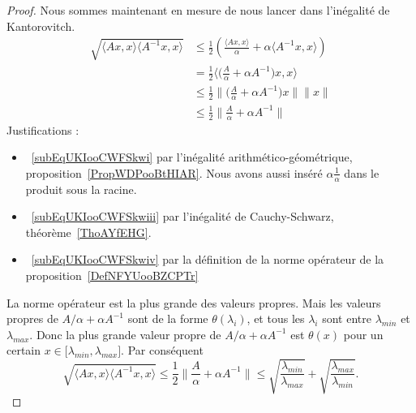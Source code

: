 \begin{proof}
	Nous sommes maintenant en mesure de nous lancer dans l'inégalité de Kantorovitch.
	\begin{subequations}
		\begin{align}
			\sqrt{\langle Ax, x\rangle \langle A^{-1}x, x\rangle } & \leq  \frac{ 1 }{2}\left( \frac{ \langle Ax, x\rangle  }{ \alpha }+\alpha\langle A^{-1}x, x\rangle  \right)   \label{subEqUKIooCWFSkwi} \\
			                                                       & =   \frac{ 1 }{2}\langle \big( \frac{ A }{ \alpha }+\alpha A^{-1} \big)x , x\rangle                                                     \\
			                                                       & \leq  \frac{ 1 }{2} \Big\| \big( \frac{ A }{ \alpha }+\alpha A^{-1} \big)x \|\| x \|                \label{subEqUKIooCWFSkwiii}         \\
			                                                       & \leq  \frac{ 1 }{2}\| \frac{ A }{ \alpha }+\alpha A^{-1} \| \label{subEqUKIooCWFSkwiv}
		\end{align}
	\end{subequations}
	Justifications :
	\begin{itemize}
		\item~\ref{subEqUKIooCWFSkwi} par l'inégalité arithmético-géométrique, proposition~\ref{PropWDPooBtHIAR}. Nous avons aussi inséré \( \alpha\frac{1}{ \alpha }\) dans le produit sous la racine.
		\item~\ref{subEqUKIooCWFSkwiii} par l'inégalité de Cauchy-Schwarz, théorème~\ref{ThoAYfEHG}.
		\item~\ref{subEqUKIooCWFSkwiv} par la définition de la norme opérateur de la proposition~\ref{DefNFYUooBZCPTr}
	\end{itemize}
	La norme opérateur est la plus grande des valeurs propres. Mais les valeurs propres de \( A/\alpha+\alpha A^{-1}\) sont de la forme \( \theta(\lambda_i)\), et tous les \( \lambda_i\) sont entre \( \lambda_{min} \) et \( \lambda_{max}\). Donc la plus grande valeur propre de \( A/\alpha+\alpha A^{-1}\) est \( \theta(x)\) pour un certain \( x\in\mathopen[ \lambda_{min} , \lambda_{max} \mathclose]\). Par conséquent
	\begin{equation}
		\sqrt{\langle Ax, x\rangle \langle A^{-1}x, x\rangle }\leq \frac{ 1 }{2}\| \frac{ A }{ \alpha }+\alpha A^{-1} \| \leq \sqrt{\frac{ \lambda_{min} }{ \lambda_{max} }}+\sqrt{\frac{ \lambda_{max} }{ \lambda_{min} }}.
	\end{equation}
\end{proof}

